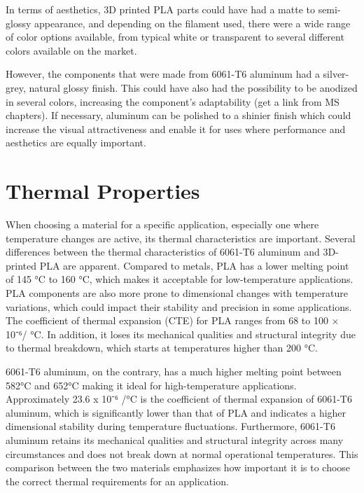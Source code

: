     In terms of aesthetics, 3D printed PLA parts could have had a matte to semi-glossy appearance, and
    depending on the filament used, there were a wide range of color options available, from typical white
    or transparent to several different colors available on the market.

    However, the components that were made from 6061-T6 aluminum had a silver-grey, natural glossy
    finish. This could have also had the possibility to be anodized in several colors, increasing the
    component's adaptability (get a link from MS chapters). If necessary, aluminum can be polished to a
    shinier finish which could increase the visual attractiveness and enable it for uses where performance
    and aesthetics are equally important.

\section{Thermal Properties}

    When choosing a material for a specific application, especially one where temperature changes are
    active, its thermal characteristics are important. Several differences between the thermal
    characteristics of 6061-T6 aluminum and 3D-printed PLA are apparent. Compared to metals, PLA has a
    lower melting point of 145 °C to 160 °C, which makes it acceptable for low-temperature applications. PLA
    components are also more prone to dimensional changes with temperature variations, which could
    impact their stability and precision in some applications. The coefficient of thermal expansion (CTE) for PLA
    ranges from 68 to 100 × 10⁻⁶/ °C. In addition, it loses its mechanical qualities and structural integrity due
    to thermal breakdown, which starts at temperatures higher than 200 °C.
    

    6061-T6 aluminum, on the contrary, has a much higher melting point between 582°C and 652°C making it ideal for high-temperature applications. Approximately 23.6 x 10⁻⁶ /°C is the coefficient of
    thermal expansion of 6061-T6 aluminum, which is significantly lower than that of PLA and indicates a higher dimensional stability during temperature fluctuations. Furthermore, 6061-T6 aluminum retains its
    mechanical qualities and structural integrity across many circumstances and does not break down at
    normal operational temperatures. This comparison between the two materials emphasizes how important it is to choose the correct thermal requirements for an application. %

